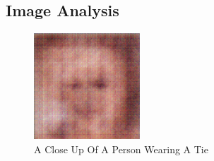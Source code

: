 \documentclass{article}%
\begin{document}
%
\subsection{Image Analysis}%
\label{subsec:ImageAnalysis}%


\begin{figure}[h!]%
\centering%
\includegraphics[width=150px]{500_fake_images/samples_5_481.png}%
\caption{A Close Up Of A Person Wearing A Tie}%
\end{figure}

%
\end{document}
